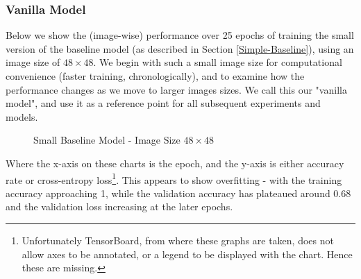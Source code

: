 \documentclass[11pt]{article} %
\theoremstyle{plain}
\theoremstyle{definition}
\begin{document}
\subsubsection{Vanilla Model}
Below we show the (image-wise) performance over 25 epochs of training the small version of the baseline model (as described in Section \ref{Simple-Baseline}), using an image size of \(48 \times 48\). We begin with such a small image size for computational convenience (faster training, chronologically), and to examine how the performance changes as we move to larger images sizes. We call this our "vanilla model", and use it as a reference point for all subsequent experiments and models.
\begin{figure}[!ht]
\centering
{}
\newline
{}
\caption{Small Baseline Model - Image Size \(48 \times 48\)}
\label{fig:results_vanilla}
\end{figure}
\FloatBarrier
\noindent
Where the x-axis on these charts is the epoch, and the y-axis is either accuracy rate or cross-entropy loss\footnote{Unfortunately TensorBoard, from where these graphs are taken, does not allow axes to be annotated, or a legend to be displayed with the chart. Hence these are missing.}. This appears to show overfitting - with the training accuracy approaching 1, while the validation accuracy has plateaued around 0.68 and the validation loss increasing at the later epochs.
\end{document}
